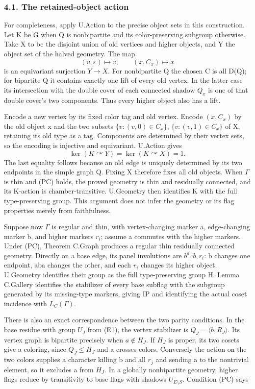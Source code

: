 \documentclass[
  11pt,
  a4paper,
]{article}
\begin{document}
\subsubsection{4.1. The retained-object
action}\label{the-retained-object-action}

For completeness, apply U.Action to the precise object sets in this
construction. Let K be G when Q is nonbipartite and its color-preserving
subgroup otherwise. Take X to be the disjoint union of old vertices and
higher objects, and Y the object set of the halved geometry. The map \[
(v,\varepsilon)\mapsto v,\qquad (x,C_x)\mapsto x
\tag{C4}
\] is an equivariant surjection \(Y\to X\). For nonbipartite Q the
chosen C is all D(Q); for bipartite Q it contains exactly one lift of
every old vertex. In the latter case its intersection with the double
cover of each connected shadow \(Q_x\) is one of that double cover's two
components. Thus every higher object also has a lift.

Encode a new vertex by its fixed color tag and old vertex. Encode
\((x,C_x)\) by the old object x and the two subsets
\(\{v:(v,0)\in C_x\}\), \(\{v:(v,1)\in C_x\}\) of X, retaining its old
type as a tag. Components are determined by their vertex sets, so the
encoding is injective and equivariant. U.Action gives \[
\ker(K\curvearrowright Y)=\ker(K\curvearrowright X)=1.
\tag{C5}
\] The last equality follows because an old edge is uniquely determined
by its two endpoints in the simple graph Q. Fixing X therefore fixes all
old objects. When \(\Gamma\) is thin and (PC) holds, the proved geometry
is thin and residually connected, and its K-action is
chamber-transitive. U.Geometry then identifies K with the full
type-preserving group. This argument does not infer the geometry or its
flag properties merely from faithfulness.

Suppose now \(\Gamma\) is regular and thin, with vertex-changing marker
a, edge-changing marker b, and higher markers \(r_i\); assume a commutes
with the higher markers. Under (PC), Theorem C.Graph produces a regular
thin residually connected geometry. Directly on a base edge, its panel
involutions are \(b^a,b,r_i\): b changes one endpoint, aba changes the
other, and each \(r_i\) changes its higher object. U.Geometry identifies
their group as the full type-preserving group H. Lemma C.Gallery
identifies the stabilizer of every base subflag with the subgroup
generated by its missing-type markers, giving IP and identifying the
actual coset incidence with \(L_C(\Gamma )\).

There is also an exact correspondence between the two parity conditions.
In the base residue with group \(U_J\) from (E1), the vertex stabilizer
is \(Q_J=\langle b,R_J\rangle\). Its vertex graph is bipartite precisely
when \(a\notin H_J\). If \(H_J\) is proper, its two cosets give a
coloring, since \(Q_J\le H_J\) and a crosses colors. Conversely the
action on the two colors supplies a character killing b and all \(r_j\)
and sending a to the nontrivial element, so it excludes a from \(H_J\).
In a globally nonbipartite geometry, higher flags reduce by transitivity
to base flags with shadows \(U_{E\setminus S}\). Condition (PC) says
\end{document}
